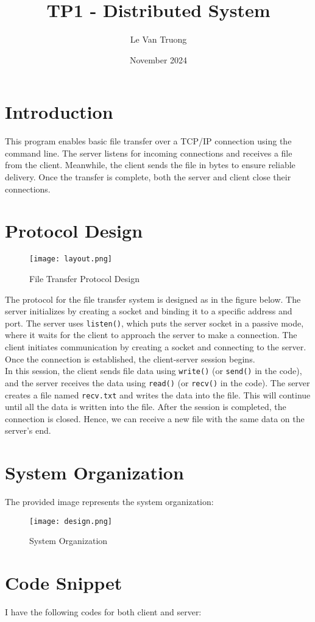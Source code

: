 \documentclass{article}
\title{TP1 - Distributed System}
\author{Le Van Truong}
\date{November 2024}
\begin{document}
\maketitle

\section{Introduction}
This program enables basic file transfer over a TCP/IP connection using the command line. The server listens for incoming connections and receives a file from the client. Meanwhile, the client sends the file in bytes to ensure reliable delivery. Once the transfer is complete, both the server and client close their connections.
\section{Protocol Design}
\begin{figure}[H]
    \centering
    \texttt{[image: layout.png]}
    \caption{File Transfer Protocol Design}
\end{figure}
The protocol for the file transfer system is designed as in the figure below. The server initializes by creating a socket and binding it to a specific address and port. The server uses \texttt{listen()}, which puts the server socket in a passive mode, where it waits for the client to approach the server to make a connection. The client initiates communication by creating a socket and connecting to the server. Once the connection is established, the client-server session begins. 
\\In this session, the client sends file data using \texttt{write()} (or \texttt{send()} in the code), and the server receives the data using \texttt{read()} (or \texttt{recv()} in the code). The server creates a file named \texttt{recv.txt} and writes the data into the file. This will continue until all the data is written into the file. After the session is completed, the connection is closed. Hence, we can receive a new file with the same data on the server's end.
\section{System Organization}
The provided image represents the system organization:
\begin{figure}[H]
    \centering
    \texttt{[image: design.png]}
    \caption{System Organization}
\end{figure}
\section{Code Snippet}
I have the following codes for both client and server:
\end{document}
